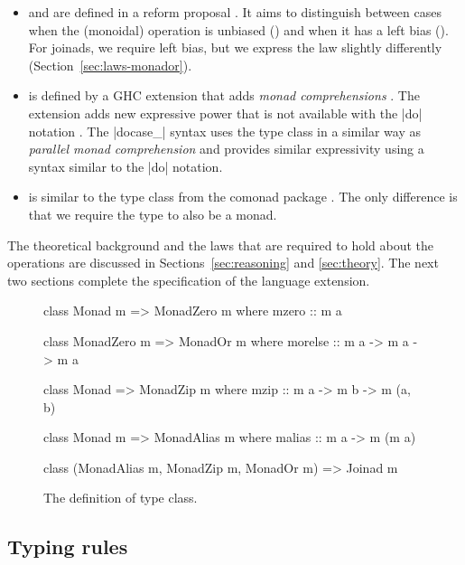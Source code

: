 \documentclass{sigplanconf}
\begin{document}
\begin{itemize}
\item {} and  are defined in a  reform proposal
\cite{monadplusreform}. It aims to distinguish between cases when the (monoidal) operation is 
unbiased () and when it has a left bias (). For joinads, we 
require left bias, but we express the law slightly differently (Section~\ref{sec:laws-monador}).

\item {} is defined by a GHC extension that adds \textit{monad comprehensions}
\cite{bringbackmc, comprefun}. The extension adds new expressive power that is not available with 
the |do| notation \cite{parcomprefun}. The |docase_| syntax uses the  type class in 
a similar way as \textit{parallel monad comprehension} and provides similar expressivity using 
a syntax similar to the |do| notation.

\item {} is similar to the  type class from the comonad 
package \cite{comonadpkg}. The only difference is that we require the type to also be a monad.

\end{itemize}
The theoretical background and the laws that are required to hold about the operations are discussed 
in Sections~\ref{sec:reasoning} and \ref{sec:theory}. The next 
two sections complete the specification of the language extension.

\begin{figure}
\begin{code}
class Monad m => MonadZero m where
   mzero :: m a

class MonadZero m => MonadOr m where
   morelse :: m a -> m a -> m a

class Monad => MonadZip m where
  mzip :: m a -> m b -> m (a, b)

class Monad m => MonadAlias m where
  malias :: m a -> m (m a)

class (MonadAlias m, MonadZip m, MonadOr m) 
  => Joinad m
\end{code}
\caption{ The definition of  type class. }
\label{fig:joinad-classes}
\end{figure}


\subsection{Typing rules}
\label{sec:extension-typing}
\end{document}
